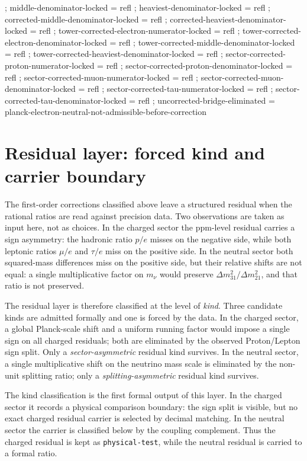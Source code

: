 \documentclass[11pt]{article}
\begin{document}
\begin{code}
{  ; middle-denominator-locked   = refl
  ; heaviest-denominator-locked = refl
  ; corrected-middle-denominator-locked = refl
  ; corrected-heaviest-denominator-locked = refl
  ; tower-corrected-electron-numerator-locked = refl
  ; tower-corrected-electron-denominator-locked = refl
  ; tower-corrected-middle-denominator-locked = refl
  ; tower-corrected-heaviest-denominator-locked = refl
  ; sector-corrected-proton-numerator-locked = refl
  ; sector-corrected-proton-denominator-locked = refl
  ; sector-corrected-muon-numerator-locked = refl
  ; sector-corrected-muon-denominator-locked = refl
  ; sector-corrected-tau-numerator-locked = refl
  ; sector-corrected-tau-denominator-locked = refl
  ; uncorrected-bridge-eliminated = planck-electron-neutral-not-admissible-before-correction
  }
\end{code}

\section{Residual layer: forced kind and carrier boundary}

The first-order corrections classified above leave a structured residual
when the rational ratios are read against precision data.  Two
observations are taken as input here, not as choices.  In the charged
sector the ppm-level residual carries a sign asymmetry: the hadronic
ratio $p/e$ misses on the negative side, while both leptonic ratios
$\mu/e$ and $\tau/e$ miss on the positive side.  In the neutral sector
both squared-mass differences miss on the positive side, but their
relative shifts are not equal: a single multiplicative factor on
$m_\nu$ would preserve $\Delta m^2_{31}/\Delta m^2_{21}$, and that ratio
is not preserved.

The residual layer is therefore classified at the level of \emph{kind}.
Three candidate kinds are admitted formally and one is forced by the
data.  In the charged sector, a global Planck-scale shift and a uniform
running factor would impose a single sign on all charged residuals; both
are eliminated by the observed Proton/Lepton sign split.  Only a
\emph{sector-asymmetric} residual kind survives.  In the neutral sector,
a single multiplicative shift on the neutrino mass scale is eliminated
by the non-unit splitting ratio; only a \emph{splitting-asymmetric}
residual kind survives.

The kind classification is the first formal output of this layer.  In
the charged sector it records a physical comparison boundary: the sign
split is visible, but no exact charged residual carrier is selected by
decimal matching.  In the neutral sector the carrier is classified below
by the coupling complement.  Thus the charged residual is
kept as \texttt{physical-test}, while the neutral residual is carried to
a formal ratio.
\end{document}
